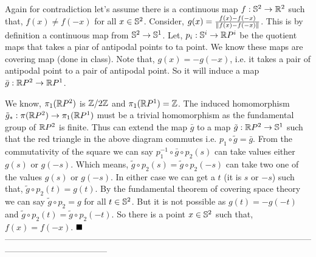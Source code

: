 \documentclass[11pt]{article}
\begin{document}
 \vspace*{0.2cm}

 \begin{wrapfigure}{r}{5cm}
\end{wrapfigure}


\noindent Again for contradiction let's assume there is a continuous map $f:\mathbb{S}^2 \to \mathbb{R}^2$ such that, $f(x)\neq f(-x)$ for all $x \in \mathbb{S}^2$. Consider, $g(x) = \frac{f(x)-f(-x)}{\norm{f(x)-f(-x)}}$. This is by definition a continuous map from $\mathbb{S}^2 \to \mathbb{S}^1$. Let, $p_i : \mathbb{S}^i \to \mathbb{R} P^i$ be the quotient maps that takes a piar of antipodal points to ta point. We know these maps are covering map (done in class). Note that, $g(x) = - g(-x)$, i.e. it takes a pair of antipodal point to a pair of antipodal point. So it will induce a map $\bar{g} : \mathbb{R} P^2 \to \mathbb{R} P^1$.

\vspace*{0.2cm}

\noindent We know, $\pi_1(\mathbb{R} P^2)$ is $\mathbb{Z}/2\mathbb{Z}$ and $\pi_1(\mathbb{R} P^1)=\mathbb{Z}$. The induced homomorphism $\tilde{g}_* : \pi(\mathbb{R} P^2) \to \pi_1(\mathbb{R} P^1)$ must be a trivial homomorphism as the fundamental group of $\mathbb{R} P^2$ is finite. Thus can extend the map $\bar{g}$ to a map $\tilde{g} : \mathbb{R} P^2 \to \mathbb{S}^1$ such that the red triangle in the above diagram commutes i.e. $p_1 \circ \tilde{g} = \bar{g}$. From the commutativity of the square we can say $p_1^{-1}\circ \bar{g} \circ p_2(s)$ can take values either $g(s)$ or $g(-s)$. Which means, $\tilde{g} \circ p_2(s)= \tilde{g} \circ p_2(-s)$ can take two one of the values $g(s)$ or $g(-s)$. In either case we can get a $t$ (it is $s$ or $-s$) such that, $\tilde{g} \circ p_2(t) = g(t)$. By the fundamental theorem of covering space theory we can say $\tilde{g} \circ p_2 = g$ for all $t \in \mathbb{S}^2$. But it is not possible as $g(t) = - g(-t)$ and $\tilde{g} \circ p_2(t) = \tilde{g} \circ p_2 (-t)$.  So there is a point $x \in \mathbb{S}^2$ such that, $f(x)=f(-x)$. $\hfill \blacksquare$
------------------------------------------------------------------------------------------------------------------------------------------------
\end{document}
